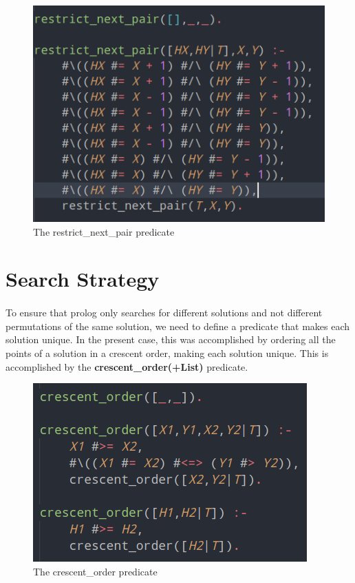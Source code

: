 \documentclass[runningheads]{llncs}
\begin{document}
\begin{figure}
    \begin{center}
        \includegraphics[scale=0.5]{images/restrictPair.png}
        \caption{The restrict\_next\_pair predicate} \label{fig3}
    \end{center}
\end{figure}

\section{Search Strategy}
\paragraph{}
To ensure that prolog only searches for different solutions and not different permutations of the same solution, we need to define
a predicate that makes each solution unique. In the present case, this was accomplished by ordering all the points
of a solution in a crescent order, making each solution unique. This is accomplished by the \textbf{crescent\_order(+List)}
predicate.

\begin{figure}
    \begin{center}
        \includegraphics[scale=0.5]{images/crescent.png}
        \caption{The crescent\_order predicate} \label{fig4}
    \end{center}
\end{figure}
\end{document}
